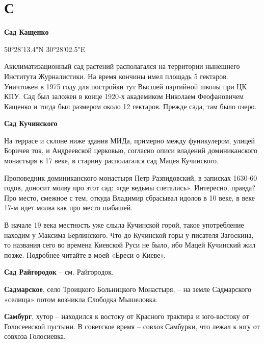 \chapter*{С}

\textbf{Сад Кащенко}

50°28'13.4"N 30°28'02.5"E

Акклиматизационный сад растений располагался на территории нынешнего Института Журналистики. На время кончины имел площадь 5 гектаров. Уничтожен в 1975 году для постройки тут Высшей партийной школы при ЦК КПУ. Сад был заложен в конце 1920-х академиком Николаем Феофановичем Кащенко и тогда был размером около 12 гектаров. Прежде сада, там было озеро.\\

\medskip


\textbf{Сад Кучинского}

На террасе и склоне ниже здания МИДа, примерно между фуникулером, улицей Боричев ток, и Андреевской церковью, согласно описи владений доминиканского монастыря в 17 веке, в старину располагался сад Мацея Кучинского.

Проповедник доминиканского монастыря Петр Развидовский, в записках 1630-60 годов\cite{sbornikmat}, доносит молву про этот сад: «где ведьмы слетались». Интересно, правда? Про место, смежное с тем, откуда Владимир сбрасывал идолов в 10 веке, в веке 17-м идет молва как про место шабашей. 

В начале 19 века местность уже слыла Кучинской горой, такое употребление находим у Максима Берлинского. Что до Кучинской горы у писателя Загоскина, то названия сего во времена Киевской Руси не было, ибо Мацей Кучинский жил позже. Подробнее читайте в моей «Ереси о Киеве».\\

\medskip

\textbf{Сад Райгородок} – см. Райгородок.\\

\medskip

\textbf{Садмарское}, село Троицкого Больницкого Монастыря, – на земле Садмарского «селища» потом возникла Слободка Мышеловка.\\

\medskip

\textbf{Самбург}, хутор – находился к востоку от Красного трактира и юго-востоку от Голосеевской пустыни. В советское время – совхоз Самбурки, что лежал к югу от совхоза Голосиевка.\\

